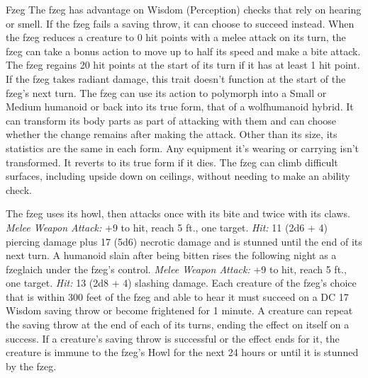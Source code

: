 \documentclass[10pt,a4paper,twoside,twocolumn,openany,bg=print,nodeprecatedcode]{dndbook}
\begin{document}
\begin{DndMonster}[float*=t]{Fzeg}
\DndMonsterBasics[
armor-class = {16 (natural armor)},
hit-points = {\DndDice{18d8 + 72}},
speed = {40 ft.}
]
\DndMonsterAbilityScores[
 str = 18,
 dex = 18,
 con = 18,
 int = 17,
 wis = 15,
 cha = 18
]
\DndMonsterDetails[
saving-throws = {Dex +9, Wis +7},
skills = {Perception +7, Stealth +9},
damage-resistances = {necrotic; bludgeoning, piercing, slashing from nonmagical attacks},
senses = {darkvision 120 ft., passive perception 17},
languages = {any four languages},
challenge = 16,
]
The fzeg has advantage on Wisdom (Perception) checks that rely on hearing or smell.
If the fzeg fails a saving throw, it can choose to succeed instead.
When the fzeg reduces a creature to 0 hit points with a melee attack on its turn, the fzeg can take a bonus action to move up to half its speed and make a bite attack.
The fzeg regains 20 hit points at the start of its turn if it has at least 1 hit point. If the fzeg takes radiant damage, this trait doesn't function at the start of the fzeg's next turn.
The fzeg can use its action to polymorph into a Small or Medium humanoid or back into its true form, that of a wolfhumanoid hybrid. It can transform its body parts as part of attacking with them and can choose whether the change remains after making the attack. Other than its size, its statistics are the same in each form. Any equipment it's wearing or carrying isn't transformed. It reverts to its true form if it dies.
The fzeg can climb difficult surfaces, including upside down on ceilings, without needing to make an ability check.
\par
{}
The fzeg uses its howl, then attacks once with its bite and twice with its claws.
\textsl{Melee Weapon Attack:} +9 to hit, reach 5 ft., one target. \textsl{Hit:} 11 (2d6 + 4) piercing damage plus 17 (5d6) necrotic damage and is stunned until the end of its next turn. A humanoid slain after being bitten rises the following night as a fzeglaich under the fzeg's control.
\textsl{Melee Weapon Attack:} +9 to hit, reach 5 ft., one target. \textsl{Hit:} 13 (2d8 + 4) slashing damage.
Each creature of the fzeg's choice that is within 300 feet of the fzeg and able to hear it must succeed on a DC 17 Wisdom saving throw or become frightened for 1 minute. A creature can repeat the saving throw at the end of each of its turns, ending the effect on itself on a success. If a creature's saving throw is successful or the effect ends for it, the creature is immune to the fzeg's Howl for the next 24 hours or until it is stunned by the fzeg.

\end{DndMonster}
\end{document}
